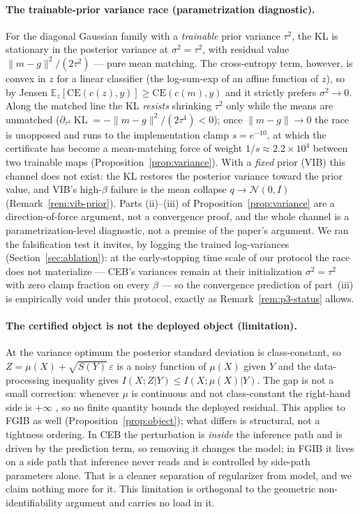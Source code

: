 \documentclass{article} %
\newcommand{\KLd}{\operatorname{KL}}
\newcommand{\CE}{\mathrm{CE}}
\newcommand{\Ncal}{\mathcal{N}}
\begin{document}
\paragraph{The trainable-prior variance race (parametrization diagnostic).}
For the diagonal Gaussian family with a \emph{trainable} prior variance $\tau^2$, the KL
is stationary in the posterior variance at
$\sigma^2 = \tau^2$, with residual value $\|m-g\|^2/(2\tau^2)$ --- pure mean matching. The
cross-entropy term, however, is convex in $z$ for a linear classifier (the log-sum-exp of
an affine function of $z$), so by Jensen
$\mathbb{E}_z[\CE(c(z),y)] \ge \CE(c(m),y)$ and it strictly prefers $\sigma^2 \to 0$.
Along the matched line the KL \emph{resists} shrinking $\tau^2$ only while the means are
unmatched ($\partial_{\tau^2}\KLd = -\|m-g\|^2/(2\tau^4) < 0$); once $\|m-g\| \to 0$ the
race is unopposed and runs to the implementation clamp $s = e^{-10}$, at which the
certificate has become a mean-matching force of weight
$1/s \approx 2.2\times 10^{4}$ between two trainable maps
(Proposition~\ref{prop:variance}). With a \emph{fixed} prior (VIB) this channel does not
exist: the KL restores the posterior variance toward the prior value, and VIB's
high-$\beta$ failure is the mean collapse $q \to \Ncal(0,I)$
(Remark~\ref{rem:vib-prior}). Parts (ii)--(iii) of Proposition~\ref{prop:variance} are a
direction-of-force argument, not a convergence proof, and the whole channel is a
parametrization-level diagnostic, not a premise of the paper's argument. We ran the
falsification test it invites, by logging the trained log-variances
(Section~\ref{sec:ablation}): at the
early-stopping time scale of our protocol the race does not materialize --- CEB's
variances remain at their initialization $\sigma^2 = \tau^2$ with zero clamp fraction on
every $\beta$ --- so the convergence prediction of part~(iii) is empirically void under
this protocol, exactly as Remark~\ref{rem:p3-status} allows.

\paragraph{The certified object is not the deployed object (limitation).}
At the variance optimum the posterior standard deviation is class-constant, so
$Z = \mu(X) + \sqrt{S(Y)}\,\varepsilon$ is a noisy function of $\mu(X)$ given $Y$ and the
data-processing inequality gives $I(X;Z|Y) \le I(X;\mu(X)|Y)$. The gap is not a small
correction: whenever $\mu$ is continuous and not class-constant the right-hand side is
$+\infty$ \citep{amjad2020learning,kolchinsky2019nib}, so no finite quantity bounds the
deployed residual. This applies to FGIB as well (Proposition~\ref{prop:object}); what
differs is structural, not a tightness ordering. In CEB the perturbation is \emph{inside}
the inference path and is driven by the prediction term, so removing it changes the
model; in FGIB it lives on a side path that inference never reads and is controlled by
side-path parameters alone. That is a cleaner separation of regularizer from model, and
we claim nothing more for it. This limitation is orthogonal to the geometric
non-identifiability argument and carries no load in it.
\end{document}
